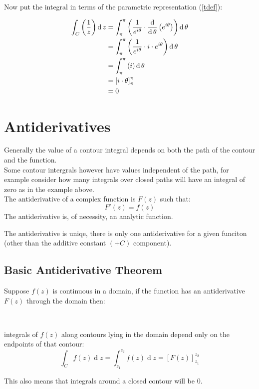 \documentclass[class=article, crop=false]{standalone}
\begin{document}
\noindent   Now put the integral in terms of the parametric representation (\ref{tdef}):

   \begin{align}
       \int^{}_{C}\left( \frac{1}{z} \right) \operatorname{d}z &=  \int^{\pi}_{\pi}\left( \frac{1}{e^{i\theta}} \cdot \frac{\operatorname{d} }{\operatorname{d} \theta}\left( e^{i\theta} \right)  \right) \operatorname{d}\theta \notag \\
       &= \int^{\pi}_{\pi}\left( \frac{1}{e^{i\theta}} \cdot i\cdot e^{i\theta} \right) \operatorname{d}\theta \notag \\
       &= \int^{\pi}_{\pi}\left( i \right) \operatorname{d}\theta \notag \\  
       &= \left[ i \cdot \theta \right]^{\pi}_{\pi} \notag \\
       &= 0
     \label{excontint1}
   \end{align}

   \section{Antiderivatives}
   Generally the value of a contour integral depends on both the path of the contour and the function.\\
   Some contour intergrals however have values independent of the path, for example consider how many integrals over closed paths will have an integral of zero as in the example above.\\

   The antiderivative of a complex function is $F\left( z \right) $ such that:
   \[
   F'\left( z \right) = f\left( z \right) 
   \]
   The antiderivative is, of necessity, an analytic function.

   The antiderivative is uniqe, there is only one antiderivative for a given funciton (other than the additive constant $\left( +  C \right) $ component).

   \subsection{Basic Antiderivative Theorem}
   Suppose $f\left( z \right) $ is continuous in a domain, if the function has an antiderivative $F\left( z \right) $ through the domain then:

   \ \
   
   \hfill\begin{minipage}{\dimexpr\textwidth-3cm}
   integrals of $f\left( z \right) $ along contours lying in the domain depend only on the endpoints of that contour:
   \[
     \int^{}_{C}f\left( z \right)  \operatorname{d}z = \int^{z_2}_{z_1} f\left( z \right)   \operatorname{d}z = \left[ F\left( z \right)  \right]^{z_2}_{z_1} 
   \]

   This also means that integrals around a closed contour will be 0.
   \end{minipage}
   \ \
   
\end{document}
